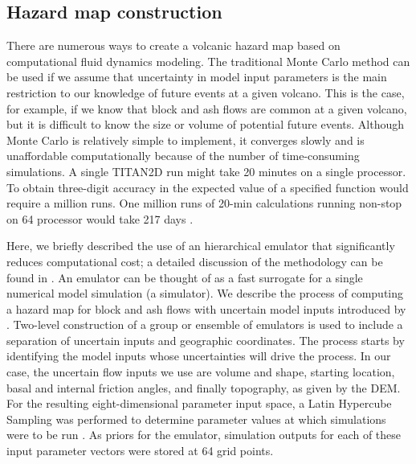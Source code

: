 \documentclass[12pt]{article}
\begin{document}
\subsection{Hazard map construction}
 
There are numerous ways to create a volcanic hazard map based on
computational fluid dynamics modeling.  The traditional Monte Carlo
method can be used if we assume that uncertainty in model input
parameters is the main restriction to our knowledge of future events
at a given volcano.  This is the case, for example, if we know that
block and ash flows are common at a given volcano, but it is difficult
to know the size or volume of potential future events.  Although Monte
Carlo is relatively simple to implement, it converges slowly and is
unaffordable computationally because of the number of time-consuming
simulations.  A single TITAN2D run might take 20 minutes on a single
processor. To obtain three-digit accuracy in the expected value of a
specified function would require a million runs. One million runs of
20-min calculations running non-stop on 64 processor would take 217
days \citep{Keith}.

Here, we briefly described the use of an hierarchical emulator that
significantly reduces computational cost; a detailed discussion of the
methodology can be found in \citet{dalbeythesis, Keith}. An emulator
can be thought of as a fast surrogate for a single numerical model
simulation (a simulator).  We describe the process of computing a
hazard map for block and ash flows with uncertain model inputs
introduced by \citet{dalbeythesis}.  Two-level construction of a group
or ensemble of emulators is used to include a separation of uncertain
inputs and geographic coordinates.  The process starts by identifying
the model inputs whose uncertainties will drive the process. In our
case, the uncertain flow inputs we use are volume and shape, starting
location, basal and internal friction angles, and finally topography,
as given by the DEM.  For the resulting eight-dimensional parameter
input space, a Latin Hypercube Sampling was performed to determine
parameter values at which simulations were to be run
\citep{Mitasova1996}. As priors for the emulator, simulation outputs
for each of these input parameter vectors were stored at 64 grid
points.
\end{document}
